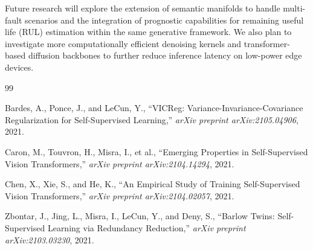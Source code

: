 \documentclass[journal]{IEEEtran}
\begin{document}
Future research will explore the extension of semantic manifolds to handle multi-fault scenarios and the integration of prognostic capabilities for remaining useful life (RUL) estimation within the same generative framework. We also plan to investigate more computationally efficient denoising kernels and transformer-based diffusion backbones to further reduce inference latency on low-power edge devices.

\begin{thebibliography}{99}

Bardes, A., Ponce, J., and LeCun, Y., ``VICReg: Variance-Invariance-Covariance Regularization for Self-Supervised Learning,'' \textit{arXiv preprint arXiv:2105.04906}, 2021.

Caron, M., Touvron, H., Misra, I., et al., ``Emerging Properties in Self-Supervised Vision Transformers,'' \textit{arXiv preprint arXiv:2104.14294}, 2021.

Chen, X., Xie, S., and He, K., ``An Empirical Study of Training Self-Supervised Vision Transformers,'' \textit{arXiv preprint arXiv:2104.02057}, 2021.

Zbontar, J., Jing, L., Misra, I., LeCun, Y., and Deny, S., ``Barlow Twins: Self-Supervised Learning via Redundancy Reduction,'' \textit{arXiv preprint arXiv:2103.03230}, 2021.







\end{thebibliography}
\end{document}
